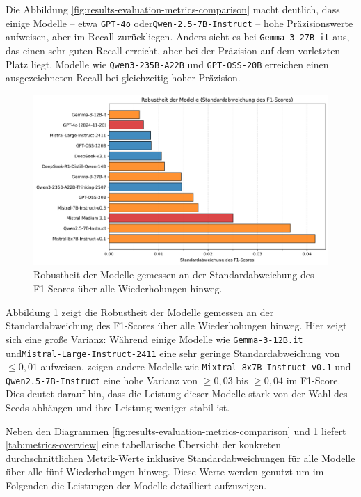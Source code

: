 Die Abbildung \ref{fig:results-evaluation-metrics-comparison} macht deutlich, dass einige Modelle – etwa \texttt{GPT-4o} oder\linebreak\texttt{Qwen-2.5-7B-Instruct} – hohe Präzisionswerte aufweisen, aber im Recall zurückliegen. Anders sieht es bei \texttt{Gemma-3-27B-it} aus, das einen sehr guten Recall erreicht, aber bei der Präzision auf dem vorletzten Platz liegt. Modelle wie \texttt{Qwen3-235B-A22B} und \texttt{GPT-OSS-20B} erreichen einen ausgezeichneten Recall bei gleichzeitig hoher Präzision.

\begin{figure}[htbp]
    \centering
    \includegraphics[width=\textwidth]{images/results/evaluation_robustness_f1_std}
    \caption{Robustheit der Modelle gemessen an der Standardabweichung des F1-Scores über alle Wiederholungen hinweg.}
    \label{fig:results-evaluation-robustness-f1-std}
\end{figure}

Abbildung \ref{fig:results-evaluation-robustness-f1-std} zeigt die Robustheit der Modelle gemessen an der Standardabweichung des F1-Scores über alle Wiederholungen hinweg. Hier zeigt sich eine große Varianz: Während einige Modelle wie \texttt{Gemma-3-12B.it} und\linebreak\texttt{Mistral-Large-Instruct-2411} eine sehr geringe Standardabweichung von $\le 0{,}01$ aufweisen, zeigen andere Modelle wie \texttt{Mixtral-8x7B-Instruct-v0.1} und \texttt{Qwen2.5-7B-Instruct} eine hohe Varianz von $\ge 0{,}03$ bis $\ge 0{,}04$ im F1-Score. Dies deutet darauf hin, dass die Leistung dieser Modelle stark von der Wahl des Seeds abhängen und ihre Leistung weniger stabil ist.

Neben den Diagrammen \ref{fig:results-evaluation-metrics-comparison} und \ref{fig:results-evaluation-robustness-f1-std} liefert \autoref{tab:metrics-overview} eine tabellarische
Übersicht der konkreten durchschnittlichen Metrik-Werte inklusive Standardabweichungen für alle Modelle über alle fünf Wiederholungen hinweg. Diese Werte werden genutzt um im Folgenden die Leistungen der Modelle detailliert aufzuzeigen.

